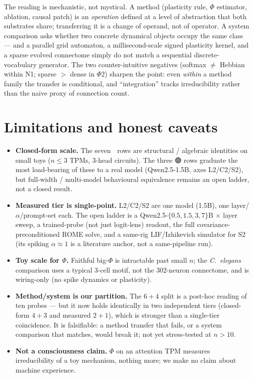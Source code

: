 \documentclass[11pt,a4paper]{article}
\providecommand{\tierBlue}{🔵}
\providecommand{\tierGreen}{🟢}
\begin{document}
\noindent The reading is mechanistic, not mystical. A method
(plasticity rule, $\Phi$ estimator, ablation, causal patch) is an
\emph{operation} defined at a level of abstraction that both substrates
share; transferring it is a change of operand, not of operator. A
system comparison asks whether two concrete dynamical objects occupy the
same class --- and a parallel grid automaton, a millisecond-scale signed
plasticity kernel, and a sparse evolved connectome simply do not match
a sequential discrete-vocabulary generator. The two counter-intuitive
negatives (softmax $\ne$ Hebbian within N1; sparse $>$ dense in $\Phi$2)
sharpen the point: even \emph{within} a method family the transfer is
conditional, and ``integration'' tracks irreducibility rather than the
naive proxy of connection count.

\section{Limitations and honest caveats}
\label{sec:limits}

\begin{itemize}\itemsep0.2em
\item \textbf{Closed-form scale.} The seven $\tierBlue$ rows are
  structural / algebraic identities on small toys ($n{\le}3$ TPMs,
  $3$-head circuits). The three $\tierGreen$ rows graduate the most
  load-bearing of these to a real model (Qwen2.5-1.5B, axes L2/C2/S2),
  but full-width / multi-model behavioural equivalence remains an open
  ladder, not a closed result.
\item \textbf{Measured tier is single-point.} L2/C2/S2 are one model
  (1.5B), one layer/$\alpha$/prompt-set each. The open ladder is a
  Qwen2.5-$\{0.5,1.5,3,7\}$B $\times$ layer sweep, a trained-probe (not
  just logit-lens) readout, the full covariance-preconditioned ROME
  solve, and a same-rig LIF/Izhikevich simulator for S2 (its spiking
  $\alpha\!\approx\!1$ is a literature anchor, not a same-pipeline run).
\item \textbf{Toy scale for $\Phi$.} Faithful big-$\Phi$ is intractable
  past small $n$; the \emph{C.\ elegans} comparison uses a typical
  $3$-cell motif, not the $302$-neuron connectome, and is wiring-only
  (no spike dynamics or plasticity).
\item \textbf{Method/system is our partition.} The $6{+}4$ split is a
  post-hoc reading of ten probes --- but it now holds identically in two
  independent tiers (closed-form $4{+}3$ and measured $2{+}1$), which is
  stronger than a single-tier coincidence. It is falsifiable: a method
  transfer that fails, or a system comparison that matches, would break
  it; not yet stress-tested at $n{>}10$.
\item \textbf{Not a consciousness claim.} $\Phi$ on an attention TPM
  measures irreducibility of a toy mechanism, nothing more; we make no
  claim about machine experience.
\end{itemize}
\end{document}
